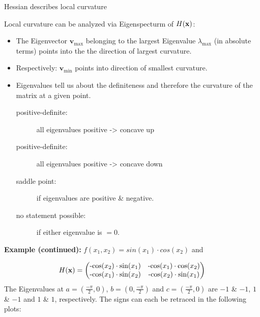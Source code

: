 \begin{vbframe}{Hessian describes local curvature} 

Local curvature can be analyzed via Eigenspecturm of $H(\mathbf{x})$:

\begin{itemize}
  \item The Eigenvector $\bm{v}_\text{max}$ belonging to the largest Eigenvalue $\lambda_\text{max}$ (in absolute terms) points into the the direction of largest curvature. 
  \item Respectively: $\bm{v}_\text{min}$ points into direction of smallest curvature.
  \item Eigenvalues tell us about the definiteness and therefore the curvature of the matrix at a given point. \begin{description}
    \item[positive-definite:] all eigenvalues positive -> concave up
    \item[positive-definite:] all eigenvalues positive -> concave down
    \item[saddle point:] if eigenvalues are positive \& negative.
    \item[no statement possible:] if either eigenvalue is $=0$.
    \end{description}
\end{itemize}

\framebreak

\textbf{Example (continued):} $f(x_1,x_2) = sin(x_1) \cdot cos(x_2)$ and 
\begin{footnotesize}
$$
H(\mathbf{x}) = \begin{pmatrix}
\text{-cos}(x_2)\cdot\text{sin}(x_1) & \text{-cos}(x_1)\cdot\text{cos}(x_2) 
\\ \text{-cos}(x_1)\cdot\text{sin}(x_2) & \text{-cos}(x_2)\cdot\text{sin}(x_1) 
\end{pmatrix}
$$
The Eigenvalues at $a=(\frac{-\pi}{2},0)$, $b=(0,\frac{-\pi}{2})$ and $c=(\frac{-\pi}{2},0)$ are $-1$ \& $-1$, $1$ \& $-1$ and $1$ \& $1$, respectively. The signs can each be retraced in the following plots:
\end{footnotesize}


\end{vbframe}

